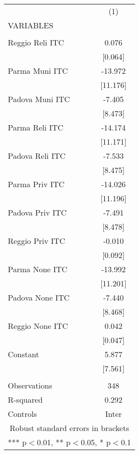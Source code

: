 \begin{tabular}{lc} \hline
 & (1) \\
VARIABLES &  \\ \hline
 &  \\
Reggio Reli ITC & 0.076 \\
 & [0.064] \\
Parma Muni ITC & -13.972 \\
 & [11.176] \\
Padova Muni ITC & -7.405 \\
 & [8.473] \\
Parma Reli ITC & -14.174 \\
 & [11.171] \\
Padova Reli ITC & -7.533 \\
 & [8.475] \\
Parma Priv ITC & -14.026 \\
 & [11.196] \\
Padova Priv ITC & -7.491 \\
 & [8.478] \\
Reggio Priv ITC & -0.010 \\
 & [0.092] \\
Parma None ITC & -13.992 \\
 & [11.201] \\
Padova None ITC & -7.440 \\
 & [8.468] \\
Reggio None ITC & 0.042 \\
 & [0.047] \\
Constant & 5.877 \\
 & [7.561] \\
 &  \\
Observations & 348 \\
R-squared & 0.292 \\
 Controls & Inter \\ \hline
\multicolumn{2}{c}{ Robust standard errors in brackets} \\
\multicolumn{2}{c}{ *** p$<$0.01, ** p$<$0.05, * p$<$0.1} \\
\end{tabular}
